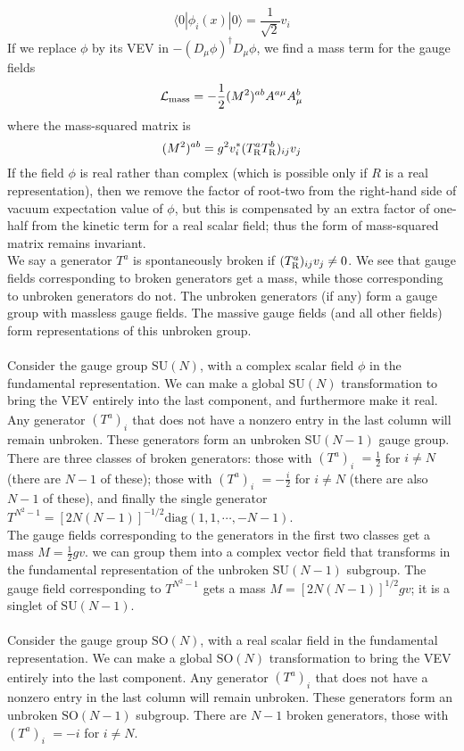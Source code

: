 \[\langle 0 | \phi_i(x) | 0 \rangle = \frac{1}{\sqrt{2}}v_i\]
If we replace $\phi$ by its VEV in $-(D_{\mu}\phi)^{\dagger}D_{\mu}\phi$, we find a mass term for the gauge fields
\[\mathcal{L}_{\rm mass} = - \frac{1}{2}(M^2)^{ab}A^{a\mu}A^b_{\mu}\]
where the mass-squared matrix is
\[(M^2)^{ab} = g^2 v_i^* (T^a_{\rm R} T^b_{\rm R})_{ij}v_j \]
If the field $\phi$ is real rather than complex (which is possible only if $R$ is a real representation), then we remove the factor of root-two from the right-hand side of vacuum expectation value of $\phi$, but this is compensated by an extra factor of one-half from the kinetic term for a real scalar field; thus the form of mass-squared matrix remains invariant.
\\
We say a generator $T^a$ is spontaneously broken if $(T^a_{\rm R})_{ij}v_j \neq 0$. We see that gauge fields corresponding to broken generators get a mass, while those corresponding to unbroken generators do not. The unbroken generators (if any) form a gauge group with massless gauge fields. The massive gauge fields (and all other fields) form
representations of this unbroken group.
\\ \\
Consider the gauge group $\mathrm{SU}(N)$, with a complex scalar field $\phi$ in the fundamental representation. We can make a global $\mathrm{SU}(N)$ transformation to bring the VEV entirely into the last component, and furthermore make it real. 
Any generator $(T^a)_{i}^{\phantom{j}}$ that does not have a nonzero entry in the last column will remain unbroken. These generators form an unbroken $\mathrm{SU}(N-1)$ gauge group. There are three classes of broken generators: those with $(T^a)_{i}^{\phantom{N}} = \frac{1}{2}$  for $i \neq N$ (there are $N-1$ of these); those with
$(T^a)_{i}^{\phantom{N}} = -\frac{i}{2}$  for $i \neq N$ (there are also $N - 1$ of these), and finally the single
generator $T^{N^2 - 1} = [2N(N-1)]^{-1/2} \mathrm{diag}(1,1,\cdots,-N-1)$. 
\\
The gauge fields corresponding to the generators in the first two classes get a mass $M = \frac{1}{2}gv$.
we can group them into a complex vector field that transforms in the fundamental representation of the unbroken $\mathrm{SU}(N-1)$ subgroup. The gauge field corresponding to $T^{N^2-1}$ gets a mass $M = [2N(N-1)]^{1/2}gv$; it is a singlet of $\mathrm{SU}(N-1)$.
\\ \\
Consider the gauge group $\mathrm{SO}(N)$, with a real scalar field in the fundamental representation. We can make a global $\mathrm{SO}(N)$ transformation to bring the VEV entirely into the last component. Any generator $(T^a)_{i}^{\phantom{j}}$ that does not have a nonzero entry in the last column will remain unbroken. These generators form an unbroken $\mathrm{SO}(N-1)$ subgroup. There are $N - 1$ broken generators, those with $(T^a)_{i}^{\phantom{N}} = -i$  for $i \neq N$. 

